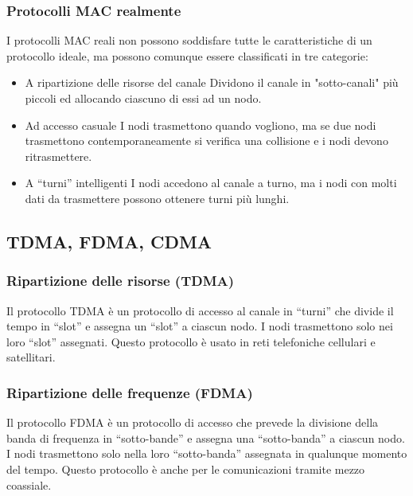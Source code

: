         \subsubsection{Protocolli \Acrshort*{MAC} realmente}
            I protocolli \Acrshort*{MAC} reali non possono soddisfare tutte le caratteristiche di un protocollo ideale, ma possono comunque essere classificati in tre categorie:
            \begin{itemize}
                \item A ripartizione delle risorse del canale
                    \subitem Dividono il canale in "sotto-canali" più piccoli ed allocando ciascuno di essi ad un nodo.
                \item Ad accesso casuale
                    \subitem I nodi trasmettono quando vogliono, ma se due nodi trasmettono contemporaneamente si verifica una collisione e i nodi devono ritrasmettere.
                \item A ``turni'' intelligenti
                    \subitem I nodi accedono al canale a turno, ma i nodi con molti dati da trasmettere possono ottenere turni più lunghi.
            \end{itemize}
    \subsection[\texttt{TDMA}, \texttt{FDMA}, \texttt{CDMA}]{\Acrshort*{TDMA}, \Acrshort*{FDMA}, \Acrshort*{CDMA}}
        \subsubsection{Ripartizione delle risorse (\Acrshort*{TDMA})}
            Il protocollo \acrfull*{TDMA} è un protocollo di accesso al canale in ``turni'' che divide il tempo in ``slot'' e assegna un ``slot'' a ciascun nodo. I nodi trasmettono solo nei loro ``slot'' assegnati. Questo protocollo è usato in reti telefoniche cellulari e satellitari.
        \subsubsection{Ripartizione delle frequenze (\Acrshort*{FDMA})}
            Il protocollo \acrfull*{FDMA} è un protocollo di accesso che prevede la divisione della banda di frequenza in ``sotto-bande'' e assegna una ``sotto-banda'' a ciascun nodo. I nodi trasmettono solo nella loro ``sotto-banda'' assegnata in qualunque momento del tempo. Questo protocollo è anche per le comunicazioni tramite mezzo coassiale.
